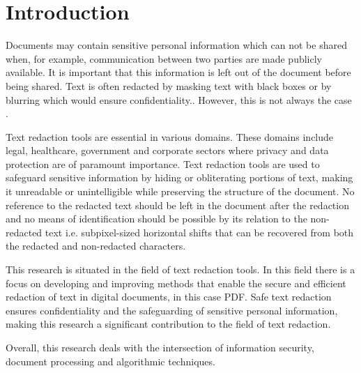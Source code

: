 \section{Introduction}
\label{sec:introduction}

Documents may contain sensitive personal information which can not be shared when, for example, communication between two parties are made publicly available. It is important that this information is left out of the document before being shared. Text is often redacted by masking text with black boxes or by blurring which would ensure confidentiality.. However, this is not always the case \cite{failures2019}. 

Text redaction tools are essential in various domains. These domains include legal, healthcare, government and corporate sectors where privacy and data protection are of paramount importance. Text redaction tools are used to safeguard sensitive information by hiding or obliterating portions of text, making it unreadable or unintelligible while preserving the structure of the document. No reference to the redacted text should be left in the document after the redaction and no means of identification should be possible by its relation to the non-redacted text i.e. subpixel-sized horizontal shifts that can be recovered from both the redacted and non-redacted characters. 

This research is situated in the field of text redaction tools. In this field there is a focus on developing and improving methods that enable the secure and efficient redaction of text in digital documents, in this case PDF. Safe text redaction ensures confidentiality and the safeguarding of sensitive personal information, making this research a significant contribution to the field of text redaction.

Overall, this research deals with the intersection of information security, document processing and algorithmic techniques.
